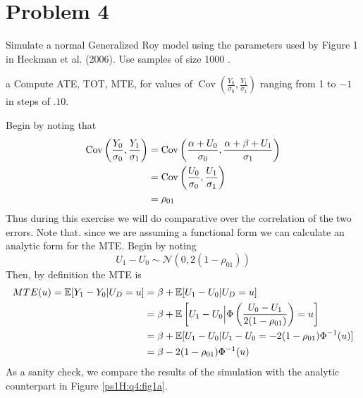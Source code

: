 \documentclass{article}
\begin{document}
\section*{Problem 4}
Simulate a normal Generalized Roy model using the parameters used by Figure 1 in Heckman et al. (2006). Use samples of size 1000 .
\begin{problem}{a}
Compute ATE, TOT, MTE, for values of $\operatorname{Cov}\left(\frac{Y_{0}}{\sigma_{0}}, \frac{Y_{1}}{\sigma_{1}}\right)$ ranging from 1 to $-1$ in steps of $.10$.
\end{problem}
\begin{solution}
Begin by noting that
\begin{align*}
    \text{Cov}\left(\frac{Y_0}{\sigma_0},\frac{Y_1}{\sigma_1}\right) &= \text{Cov}\left(\frac{\alpha + U_0}{\sigma_0},\frac{\alpha+\beta + U_1}{\sigma_1}\right) \\ &=\text{Cov}\left(\frac{U_0}{\sigma_0},\frac{U_1}{\sigma_1}\right) \\
    &=\rho_{01}
\end{align*}
Thus during this exercise we will do comparative over the correlation of the two errors. Note that. since we are assuming a functional form we can calculate an analytic form for the MTE. Begin by noting 
\begin{equation*}
    U_1-U_0\sim\mathcal{N}(0,2(1-\rho_{01}))
\end{equation*}
Then, by definition the MTE is 
\begin{align*}
    MTE(u)= \mathbb{E}[Y_1-Y_0\vert U_D= u] &= \beta + \mathbb{E}[U_1-U_0\vert U_D = u] \\ 
    &= \beta + \mathbb{E}\left[U_1-U_0\Big\vert \Phi\left(\frac{U_0-U_1}{2(1-\rho_{01})}\right) = u\right] \\ 
    &= \beta + \mathbb{E}[U_1-U_0\vert U_1-U_0 = -2(1-\rho_{01})\Phi^{-1}(u)] \\ 
    &= \beta -2(1-\rho_{01})\Phi^{-1}(u)
\end{align*}
As a sanity check, we compare the results of the simulation with the analytic counterpart in Figure \ref{ps1H:q4:fig1a}. 
\begin{figure}[htb]
    \centering
    \caption{Marginal Treatment Effect}
    \label{ps1H:q4:fig1}
    \begin{subfigure}[b]{0.43\textwidth}
         \centering

\end{subfigure}
\end{figure}
\end{solution}
\end{document}
